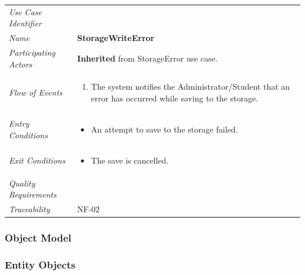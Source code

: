 \documentclass[12pt,letterpaper]{article}
\begin{document}
\begin{center}
	\begin{tabu} to 
		\toprule
		Use Case Identifier & \storagewriteerror{} \\
		Name & {\bf StorageWriteError} \\
		Participating Actors & \textbf{Inherited} from StorageError use case. \\
		Flow of Events & 
		\begin{minipage}[t]{\linewidth}
		    \begin{enumerate}
			    \item The system notifies the Administrator/Student that an error has occurred while saving to the storage.
			\end{enumerate}
		\end{minipage} \\

		Entry Conditions &
		\begin{minipage}[t]{\linewidth}
			\begin{itemize}
			    \item An attempt to save to the storage failed.
	        \end{itemize}
		\end{minipage} \\

		Exit Conditions &
		\begin{minipage}[t]{\linewidth}
			\begin{itemize}
			    \item The save is cancelled.
	        \end{itemize}
		\end{minipage} \\

		Quality Requirements & \\

		Traceability & NF-02 \\
		\toprule
	\end{tabu}
\end{center}

\subsubsection{Object Model}

\subsubsection*{Entity Objects}
\end{document}

